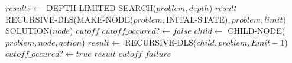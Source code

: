 \documentclass[a4paper,11pt]{report}
\begin{document}
\begin{algorithmic}
\State $results \gets$ DEPTH-LIMITED-SEARCH($problem, depth$)
\State \Return $result$
\EndIf
\EndFor
\EndFunction
\\
\State \Return RECURSIVE-DLS(MAKE-NODE($problem, $INITAL-STATE)$,problem, limit$)
\EndFunction
\\
\State \Return SOLUTION($node$)
\State \Return $cutoff$
\Else
\State $cutoff\_occured? \gets false$
\State $child \gets$ CHILD-NODE($problem, node, action$)
\State $result \gets$ RECURSIVE-DLS($child, problem, Emit - 1$)
\State $cutoff\_occured? \gets true$
\State \Return $result$
\EndIf
\EndFor
{}
\Return $cutoff$
\Else
\Return $failure$
\EndIf
\EndIf
\EndFunction
\end{algorithmic}










\end{document}

